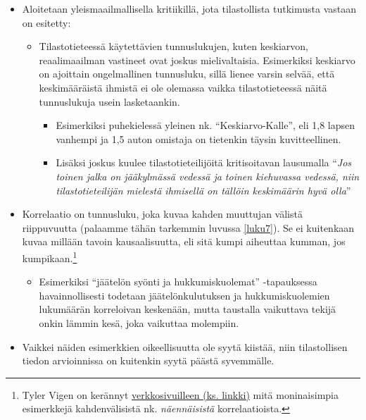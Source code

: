 \documentclass[
]{book}
\providecommand{\tightlist}{%
  \setlength{\itemsep}{0pt}\setlength{\parskip}{0pt}}
\begin{document}
\begin{itemize}
\tightlist
\item
  Aloitetaan yleismaailmallisella kritiikillä, jota tilastollista tutkimusta vastaan on esitetty:

  \begin{itemize}
  \tightlist
  \item
    Tilastotieteessä käytettävien tunnuslukujen, kuten keskiarvon, reaalimaailman vastineet ovat joskus mielivaltaisia. Esimerkiksi keskiarvo on ajoittain ongelmallinen tunnusluku, sillä lienee varsin selvää, että keskimääräistä ihmistä ei ole olemassa vaikka tilastotieteessä näitä tunnuslukuja usein lasketaankin.

    \begin{itemize}
    \tightlist
    \item
      Esimerkiksi puhekielessä yleinen nk. ``Keskiarvo-Kalle'', eli 1,8 lapsen vanhempi ja 1,5 auton omistaja on tietenkin täysin kuvitteellinen.
    \item
      Lisäksi joskus kuulee tilastotieteilijöitä kritisoitavan lausumalla ``\emph{Jos toinen jalka on jääkylmässä vedessä ja toinen kiehuvassa vedessä, niin tilastotieteilijän mielestä ihmisellä on tällöin keskimäärin hyvä olla}''
    \end{itemize}
  \end{itemize}
\item
  Korrelaatio on tunnusluku, joka kuvaa kahden muuttujan välistä riippuvuutta (palaamme tähän tarkemmin luvussa \ref{luku7}). Se ei kuitenkaan kuvaa millään tavoin kausaalisuutta, eli sitä kumpi aiheuttaa kumman, jos kumpikaan.\footnote{Tyler Vigen on kerännyt \href{https://www.tylervigen.com/spurious-correlations}{verkkosivuilleen (ks. linkki)} mitä moninaisimpia esimerkkejä kahdenvälisistä nk. \emph{näennäisistä} korrelaatioista.}

  \begin{itemize}
  \tightlist
  \item
    Esimerkiksi ``jäätelön syönti ja hukkumiskuolemat'' -tapauksessa havainnollisesti todetaan jäätelönkulutuksen ja hukkumiskuolemien lukumäärän korreloivan keskenään, mutta taustalla vaikuttava tekijä onkin lämmin kesä, joka vaikuttaa molempiin.
  \end{itemize}
\item
  Vaikkei näiden esimerkkien oikeellisuutta ole syytä kiistää, niin tilastollisen tiedon arvioinnissa on kuitenkin syytä päästä syvemmälle.
\end{itemize}
\end{document}
